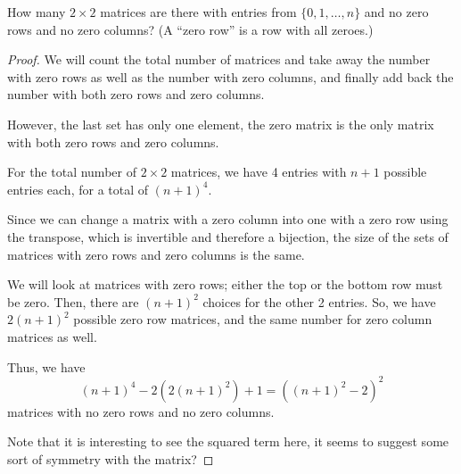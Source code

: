 \documentclass{subfiles}
\begin{document}
\begin{problem}
How many $2 \times 2$ matrices are there with entries from $\{0,1,\dots,n\}$ and no zero rows and no zero columns? (A ``zero row'' is a row with all zeroes.)
\end{problem}
\begin{proof}
	We will count the total number of matrices and take away the number with zero rows as well as the number with zero columns, and finally add back the number with both zero rows and zero columns.

	However, the last set has only one element, the zero matrix is the only matrix with both zero rows and zero columns.

	For the total number of $2\times 2$ matrices, we have 4 entries with $n+1$ possible entries each, for a total of  $(n+1)^4$.

	Since we can change a matrix with a zero column into one with a zero row using the transpose, which is invertible and therefore a bijection, the size of the sets of matrices with zero rows and zero columns is the same.

	We will look at matrices with zero rows; either the top or the bottom row must be zero.
	Then, there are $(n+1)^2$ choices for the other 2 entries.
	So, we have $2(n+1)^2$ possible zero row matrices, and the same number for zero column matrices as well.

	Thus, we have \[
		(n+1)^4-2(2(n+1)^2)+1 = ((n+1)^2-2)^2
	\] matrices with no zero rows and no zero columns.

	Note that it is interesting to see the squared term here, it seems to suggest some sort of symmetry with the matrix?
\end{proof}
\end{document}
